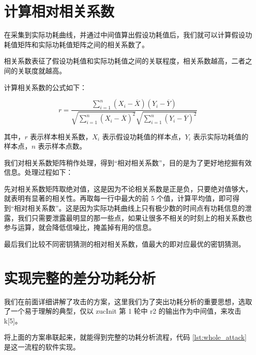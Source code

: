 \section{计算相对相关系数}

在采集到实际功耗曲线，并通过中间值算出假设功耗值后，我们就可以计算假设功耗值矩阵和实际功耗值矩阵之间的相关系数了。

相关系数表征了假设功耗值和实际功耗值之间的关联程度，相关系数越高，二者之间的关联度就越高。

计算相关系数的公式如下：

\begin{equation*}
r = \frac{\sum\limits_{i=1}^{n}(X_i-\overline{X})(Y_i-\overline{Y})}{\sqrt{\sum\limits_{i=1}^n(X_i-\overline{X})^2}\sqrt{\sum\limits_{i=1}^n(Y_i-\overline{Y})^2}}
\end{equation*}

其中，$r$ 表示样本相关系数，$X_i$ 表示假设功耗值的样本点，$Y_i$ 表示实际功耗值的样本点，$n$ 表示样本点数。

\vspace*{0.5\baselineskip}

我们对相关系数矩阵稍作处理，得到“相对相关系数”，目的是为了更好地挖掘有效信息。处理过程如下：

先对相关系数矩阵取绝对值，这是因为不论相关系数是正是负，只要绝对值够大，就表明有显著的相关性。再取每一行中最大的前 5 个值，计算平均值，即可得到“相对相关系数”。这是因为实际功耗曲线上只有极少数的时间点有功耗信息的泄露，我们只需要泄露最明显的那一些点，如果让很多不相关的时刻上的相关系数也参与运算，就会降低信噪比，掩盖掉有用的信息。

\vspace*{0.5\baselineskip}

最后我们比较不同密钥猜测的相对相关系数，值最大的即对应最优的密钥猜测。

\section{实现完整的差分功耗分析}

我们在前面详细讲解了攻击的方案，这里我们为了突出功耗分析的重要思想，选取了一个易于理解的典型，仅以 {\cnsls zucInit} 第 1 轮中 {\cnsls r2} 的输出作为中间值，来攻击 {\cnsls k[5]}。

将上面的方案串联起来，就能得到完整的功耗分析流程，代码 \ref{lst:whole_attack} 是这一流程的软件实现。

\newpage

